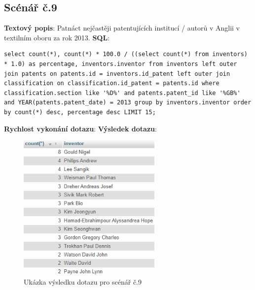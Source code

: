 \subsection{Scénář č.9}
\textbf{Textový popis}: Patnáct nejčastěji patentujících institucí / autorů v Anglii v textilním oboru za rok 2013.
\newline
\textbf{SQL}: 
\begin{lstlisting}[label = {lst:elements_a}]
select count(*), count(*) * 100.0 / ((select count(*) from inventors) * 1.0) as percentage, inventors.inventor from inventors left outer join patents on patents.id = inventors.id_patent left outer join classification on classification.id_patent = patents.id where classification.section like '%D%' and patents.patent_id like '%GB%' and YEAR(patents.patent_date) = 2013 group by inventors.inventor order by count(*) desc, percentage desc LIMIT 15;
\end{lstlisting}
\textbf{Rychlost vykonání dotazu}: 
\newline
\textbf{Výsledek dotazu}:
\begin{figure}[H]
\centering
\includegraphics[width=7cm]{img/scenare/scenar_9}
\caption{Ukázka výsledku dotazu pro scénář č.9}
\label{fig:scenar9}
\end{figure}